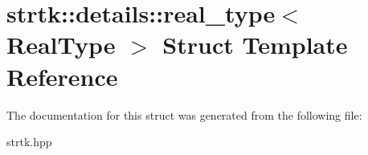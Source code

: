 \hypertarget{structstrtk_1_1details_1_1real__type}{\section{strtk\-:\-:details\-:\-:real\-\_\-type$<$ Real\-Type $>$ Struct Template Reference}
\label{structstrtk_1_1details_1_1real__type}
}


The documentation for this struct was generated from the following file\-:\begin{DoxyCompactItemize}
\item 
strtk.\-hpp\end{DoxyCompactItemize}

